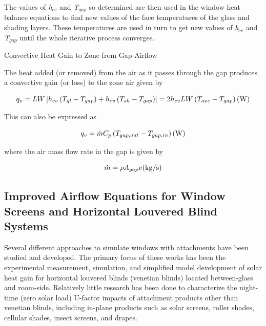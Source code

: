 The values of \emph{h\(_{cv}\)} and \emph{T\(_{gap}\)} so determined are then used in the window heat balance equations to find new values of the face temperatures of the glass and shading layers. These temperatures are used in turn to get new values of \emph{h\(_{cv}\)} and \emph{T\(_{gap}\)} until the whole iterative process converges.

Convective Heat Gain to Zone from Gap Airflow

The heat added (or removed) from the air as it passes through the gap produces a convective gain (or loss) to the zone air given by

\begin{equation}
{q_v} = LW\left[ {{h_{cv}}\left( {{T_{gl}} - {T_{gap}}} \right) + {h_{cv}}\left( {{T_{sh}} - {T_{gap}}} \right)} \right] = 2{h_{cv}}LW\left( {{T_{ave}} - {T_{gap}}} \right){\rm{    (W)}}
\end{equation}

This can also be expressed as

\begin{equation}
{q_v} = \dot m{C_p}\left( {{T_{gap,out}} - {T_{gap,in}}} \right){\rm{    (W)}}
\end{equation}

where the air mass flow rate in the gap is given by

\begin{equation}
\dot m = \rho {A_{gap}}v{\rm{    (kg/s)}}
\end{equation}

\subsection{Improved Airflow Equations for Window Screens and Horizontal Louvered Blind Systems}
Several different approaches to simulate windows with attachments have been studied and developed. The primary focus of these works has been the experimental measurement, simulation, and simplified model development of solar heat gain for horizontal louvered blinds (venetian blinds) located between-glass and room-side. Relatively little research has been done to characterize the night-time (zero solar load) U-factor impacts of attachment products other than venetian blinds, including in-plane products such as solar screens, roller shades, cellular shades, insect screens, and drapes.


